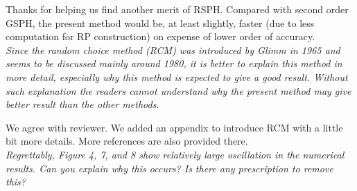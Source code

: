 \documentclass[10pt,a4paper]{article}
\begin{document}
Thanks for helping us find another merit of RSPH. Compared with second order GSPH, the present method would be, at least slightly, faster (due to less computation for RP construction) on expense of lower order of accuracy. \\[3pt] 

\textit{Since the random choice method (RCM) was introduced by Glimm in 1965 and seems to be discussed mainly around 1980, it is better to explain this method in more detail, especially why this method is expected to give a good result. Without such explanation the readers cannot understand why the present method may give better result than the other methods.}

We agree with reviewer. We added an appendix to introduce RCM with a little bit more details. More references are also provided there.\\[3pt]

\textit{Regrettably, Figure 4, 7, and 8 show relatively large oscillation in the
numerical results. Can you explain why this occurs? Is there any prescription to remove this?}
\end{document}
